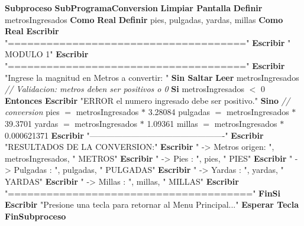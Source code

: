 \documentclass[12pt,a4paper]{article}
\newcommand{\kw}[1]{\textcolor{pseKeyword}{\textbf{#1}}}
\newcommand{\txt}[1]{\textcolor{pseString}{"#1"}}
\newcommand{\num}[1]{\textcolor{pseNumber}{#1}}
\newcommand{\cmt}[1]{\textcolor{pseComment}{\textit{// #1}}}
\newcommand{\opAsig}{\textcolor{pseKeyword}{$=$}}
\newcommand{\opPor}{\textcolor{pseKeyword}{$*$}}
\newcommand{\opMenor}{\textcolor{pseKeyword}{$<$}}
\newcommand{\Asignacion}[2]{#1\; \opAsig\; #2}
\newcommand{\Escribir}[1]{\kw{Escribir} #1}
\newcommand{\EscribirSS}[1]{\kw{Escribir} #1 \kw{Sin Saltar}}
\newcommand{\Leer}[1]{\kw{Leer} #1}
\newcommand{\Definir}[2]{\kw{Definir} #1 \kw{Como} \kw{#2}}
\newcommand{\Si}[1]{\kw{Si} #1 \kw{Entonces}}
\newcommand{\Sino}{\kw{Sino}}
\newcommand{\FinSi}{\kw{FinSi}}
\newcommand{\Subproceso}[1]{\kw{Subproceso} \textbf{#1}}
\newcommand{\FinSubproceso}{\kw{FinSubproceso}}
\newcommand{\I}{\hspace{1.5em}}
\newcommand{\II}{\hspace{3.0em}}
\begin{document}
\begin{algorithmic}[1]
		
		\State \Subproceso{SubProgramaConversion}
		\State \I \kw{Limpiar Pantalla}
		\State \I \Definir{metrosIngresados}{Real}
		\State \I \Definir{pies, pulgadas, yardas, millas}{Real}
		\State
		\State \I \Escribir{\txt{=====================================}}
		\State \I \Escribir{\txt{                  MODULO 1}}
		\State \I \Escribir{\txt{=====================================}}
		\State \I \EscribirSS{\txt{Ingrese la magnitud en Metros a convertir: }}
		\State \I \Leer{metrosIngresados}
		\State
		\State \I \cmt{Validacion: metros deben ser positivos o 0}
		\State \I \Si{metrosIngresados \opMenor{} \num{0}}
		\State \II \Escribir{\txt{ERROR el numero ingresado debe ser positivo.}}
		\State \I \Sino
		\State \II \cmt{conversion}
		\State \II \Asignacion{pies}{metrosIngresados \opPor{} \num{3.28084}}
		\State \II \Asignacion{pulgadas}{metrosIngresados \opPor{} \num{39.3701}}
		\State \II \Asignacion{yardas}{metrosIngresados \opPor{} \num{1.09361}}
		\State \II \Asignacion{millas}{metrosIngresados \opPor{} \num{0.000621371}}
		\State
		\State \II \Escribir{\txt{-------------------------------------------------}}
		\State \II \Escribir{\txt{RESULTADOS DE LA CONVERSION:}}
		\State \II \Escribir{\txt{  -> Metros origen: }, metrosIngresados, \txt{ METROS}}
		\State \II \Escribir{\txt{  -> Pies         : }, pies, \txt{ PIES}}
		\State \II \Escribir{\txt{  -> Pulgadas     : }, pulgadas, \txt{ PULGADAS}}
		\State \II \Escribir{\txt{  -> Yardas       : }, yardas, \txt{ YARDAS}}
		\State \II \Escribir{\txt{  -> Millas       : }, millas, \txt{ MILLAS}}
		\State \II \Escribir{\txt{======================================}}
		\State \I \FinSi
		\State \I \Escribir{\txt{Presione una tecla para retornar al Menu Principal...}}
		\State \I \kw{Esperar Tecla}
		\State \FinSubproceso
		

\end{algorithmic}
\end{document}
